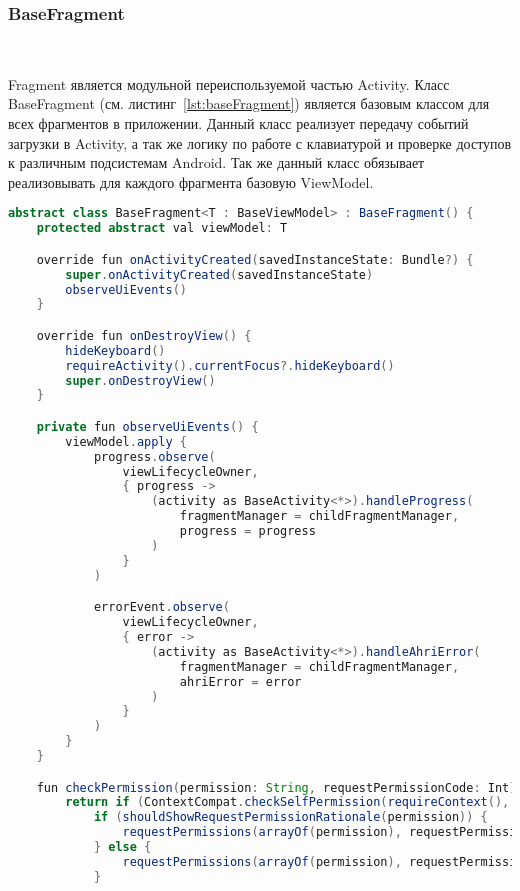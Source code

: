 \subsubsection{BaseFragment}~\par
Fragment является модульной переиспользуемой частью Activity. Класс BaseFragment (см. листинг~\ref{lst:baseFragment}) является базовым классом для всех фрагментов в приложении. Данный класс реализует передачу событий загрузки в Activity, а так же логику по работе с клавиатурой и проверке доступов к различным подсистемам Android. Так же данный класс обязывает реализовывать для каждого фрагмента базовую ViewModel.

\begin{lstlisting}[language=Java,label={lst:baseFragment},caption={Компонент BaseFragment}]
abstract class BaseFragment<T : BaseViewModel> : BaseFragment() {
    protected abstract val viewModel: T

    override fun onActivityCreated(savedInstanceState: Bundle?) {
        super.onActivityCreated(savedInstanceState)
        observeUiEvents()
    }

    override fun onDestroyView() {
        hideKeyboard()
        requireActivity().currentFocus?.hideKeyboard()
        super.onDestroyView()
    }

    private fun observeUiEvents() {
        viewModel.apply {
            progress.observe(
                viewLifecycleOwner,
                { progress ->
                    (activity as BaseActivity<*>).handleProgress(
                        fragmentManager = childFragmentManager,
                        progress = progress
                    )
                }
            )

            errorEvent.observe(
                viewLifecycleOwner,
                { error ->
                    (activity as BaseActivity<*>).handleAhriError(
                        fragmentManager = childFragmentManager,
                        ahriError = error
                    )
                }
            )
        }
    }

    fun checkPermission(permission: String, requestPermissionCode: Int): Boolean {
        return if (ContextCompat.checkSelfPermission(requireContext(), permission) != PackageManager.PERMISSION_GRANTED) {
            if (shouldShowRequestPermissionRationale(permission)) {
                requestPermissions(arrayOf(permission), requestPermissionCode)
            } else {
                requestPermissions(arrayOf(permission), requestPermissionCode)
            }


\end{lstlisting}
